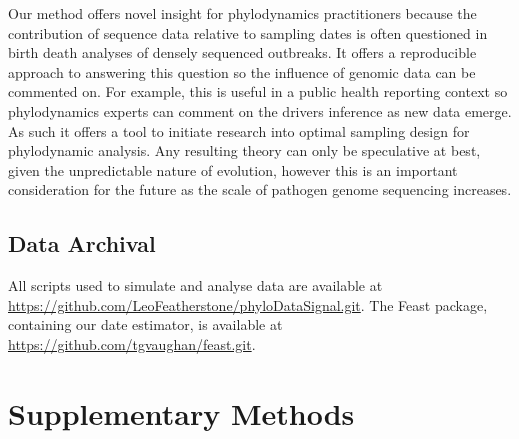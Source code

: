 \documentclass{article}
\begin{document}
Our method offers novel insight for phylodynamics practitioners because the contribution of sequence data relative to sampling dates is often questioned in birth death analyses of densely sequenced outbreaks. It offers a reproducible approach to answering this question so the influence of genomic data can be commented on. For example, this is useful in a public health reporting context so phylodynamics experts can comment on the drivers inference as new data emerge. As such it offers a tool to initiate research into optimal sampling design for phylodynamic analysis. Any resulting theory can only be speculative at best, given the unpredictable nature of evolution, however this is an important consideration for the future as the scale of pathogen genome sequencing increases.

\subsection*{Data Archival}
All scripts used to simulate and analyse data are available at \url{https://github.com/LeoFeatherstone/phyloDataSignal.git}. The Feast package, containing our date estimator, is available at \url{https://github.com/tgvaughan/feast.git}.
\section*{Supplementary Methods}
\end{document}
